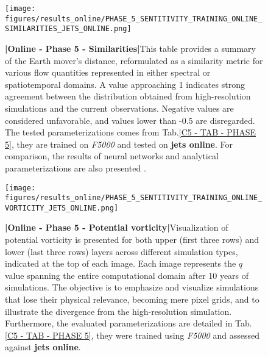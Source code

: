 %
%
\newpage

\begin{figure}[H]
    \centering
    \texttt{[image: figures/results\_online/PHASE\_5\_SENTITIVITY\_TRAINING\_ONLINE\_SIMILARITIES\_JETS\_ONLINE.png]}
    \caption{\textbf{|}\textcolor{section_color}{\textbf{Online - Phase 5 - Similarities}}\textbf{|}This table provides a summary of the Earth mover's distance, reformulated as a similarity metric for various flow quantities represented in either spectral or spatiotemporal domains. A value approaching 1 indicates strong agreement between the distribution obtained from high-resolution simulations and the current observations. Negative values are considered unfavorable, and values lower than -0.5 are disregarded. The tested parameterizations comes from Tab.\ref{C5 - TAB - PHASE 5}, they are trained on \textit{F5000} and tested on \textbf{jets online}. For comparison, the results of neural networks \citep{Benchmarking} and analytical parameterizations are also presented \citep{ClosureAnalytical2, ClosureAnalytical51, ClosureDataDrivenZanna}.}
    \label{APP - ONLINE - PHASE 5 - SIMILARITIES -  FULL 5000 and JETS ONLINE}
\end{figure}

%
%
\newpage

\begin{figure}[H]
    \centering
    \texttt{[image: figures/results\_online/PHASE\_5\_SENTITIVITY\_TRAINING\_ONLINE\_VORTICITY\_JETS\_ONLINE.png]}
    \caption{\textbf{|}\textcolor{section_color}{\textbf{Online - Phase 5 - Potential vorticity}}\textbf{|}Visualization of potential vorticity is presented for both upper (first three rows) and lower (last three rows) layers across different simulation types, indicated at the top of each image. Each image represents the $q$ value spanning the entire computational domain after 10 years of simulations. The objective is to emphasize and visualize simulations that lose their physical relevance, becoming mere pixel grids, and to illustrate the divergence from the high-resolution simulation. Furthermore, the evaluated parameterizations are detailed in Tab.\ref{C5 - TAB - PHASE 5}, they were trained using \textit{F5000} and assessed against \textbf{jets online}.}
    \label{APP - ONLINE - PHASE 5 - VORTICITY -  FULL 5000 and JETS ONLINE}
\end{figure}